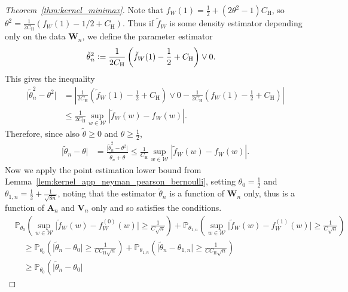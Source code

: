 \documentclass[11pt,lof]{puthesis}
\renewcommand{\P}{\ensuremath{\mathbb{P}}}
\newcommand{\rH}{\ensuremath{\mathrm{H}}}
\newcommand{\bW}{\ensuremath{\mathbf{W}}}
\newcommand{\bA}{\ensuremath{\mathbf{A}}}
\newcommand{\bV}{\ensuremath{\mathbf{V}}}
\newcommand{\cW}{\ensuremath{\mathcal{W}}}
\theoremstyle{break}
\theoremstyle{proof}
\newtheorem{proof}{Proof}
\begin{document}
\begin{proof}[Theorem~\ref{thm:kernel_minimax}]
  Note that $f_W(1) = \frac{1}{2} + (2\theta^2 - 1) C_\rH $,
  so $\theta^2 = \frac{1}{2 C_\rH}(f_W(1) - 1/2 + C_\rH)$.
  Thus if $\tilde f_W$ is some density estimator
  depending only on the data $\bW_n$,
  we define the parameter estimator
  \begin{align*}
    \tilde \theta_n^2
    &\vcentcolon=
    \frac{1}{2 C_\rH}\left(
      \tilde f_W(1) - \frac{1}{2} + C_\rH
    \right)
    \vee 0.
  \end{align*}
  This gives the inequality
  \begin{align*}
    \big|
    \tilde \theta_n^2 - \theta^2
    \big|
    &=
    \left|
      \frac{1}{2 C_\rH}\left(
        \tilde f_W(1) - \frac{1}{2} + C_\rH
      \right)
      \vee 0
      -
      \frac{1}{2 C_\rH}\left(
        f_W(1) - \frac{1}{2} + C_\rH
      \right)
    \right| \\
    &\leq
    \frac{1}{2 C_\rH}
    \sup_{w \in \cW}
    \left|
      \tilde f_W(w) - f_W(w)
    \right|.
  \end{align*}
  Therefore, since also $\tilde \theta \geq 0$
  and $\theta \geq \frac{1}{2}$,
  \begin{align*}
    \big|
    \tilde \theta_n - \theta
    \big|
    &=
    \frac{\big|\tilde \theta_n^2 - \theta^2\big|}
    {\tilde \theta_n + \theta}
    \leq
    \frac{1}{C_\rH}
    \sup_{w \in \cW}
    \left|
      \tilde f_W(w) - f_W(w)
    \right|.
  \end{align*}
  Now we apply the point estimation lower bound from
  Lemma~\ref{lem:kernel_app_neyman_pearson_bernoulli},
  setting $\theta_0 = \frac{1}{2}$
  and $\theta_{1,n} = \frac{1}{2} + \frac{1}{\sqrt{8n}}$,
  noting that the estimator
  $\tilde \theta_n$
  is a function of $\bW_n$ only,
  thus is a function of $\bA_n$ and
  $\bV_n$ only and so satisfies the conditions.
  \begin{align*}
    &\P_{\theta_0} \left(
      \sup_{w \in \cW} \big| \tilde f_W(w) - f^{(0)}_W(w) \big|
      \geq \frac{1}{C\sqrt{n}}
    \right)
    + \P_{\theta_{1,n}} \left(
      \sup_{w \in \cW} \big| \tilde f_W(w) - f^{(1)}_W(w) \big|
      \geq \frac{1}{C\sqrt{n}}
    \right) \\
    &\quad\geq
    \P_{\theta_0} \left(
      \big| \tilde \theta_n - \theta_0 \big|
      \geq \frac{1}{C C_\rH \sqrt{n}}
    \right)
    + \P_{\theta_{1,n}} \left(
      \big| \tilde \theta_n - \theta_{1,n} \big|
      \geq \frac{1}{C C_\rH \sqrt{n}}
    \right) \\
    &\quad\geq
    \P_{\theta_0} \left(
      \big| \tilde \theta_n - \theta_0 \big|

\end{align*}
\end{proof}
\end{document}

